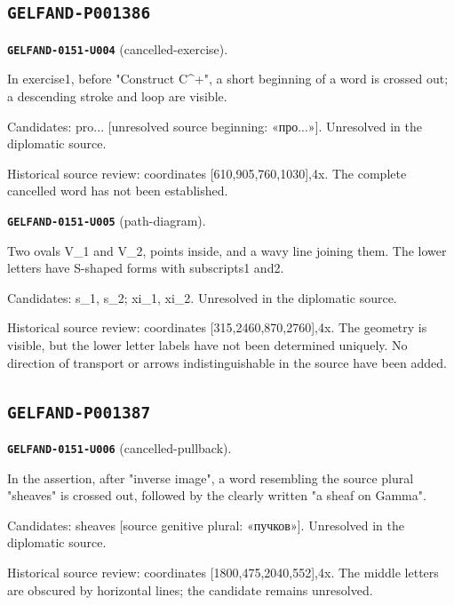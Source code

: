 \subsection*{\texttt{GELFAND-P001386}}
\par\noindent\leavevmode{}\label{GELFAND-0151-U004}\textbf{\texttt{GELFAND-0151-U004}} (cancelled-exercise).\nopagebreak[4]\par
In exercise1, before "Construct C\textasciicircum{}+", a short beginning of a word is crossed out; a descending stroke and loop are visible.\par
Candidates: pro... [unresolved source beginning: «про...»]. Unresolved in the diplomatic source.\par
Historical source review: coordinates [610,905,760,1030],4x. The complete cancelled word has not been established.\par
\medskip
\par\noindent\leavevmode{}\label{GELFAND-0151-U005}\textbf{\texttt{GELFAND-0151-U005}} (path-diagram).\nopagebreak[4]\par
Two ovals V\_1 and V\_2, points inside, and a wavy line joining them. The lower letters have S-shaped forms with subscripts1 and2.\par
Candidates: s\_1, s\_2; xi\_1, xi\_2. Unresolved in the diplomatic source.\par
Historical source review: coordinates [315,2460,870,2760],4x. The geometry is visible, but the lower letter labels have not been determined uniquely. No direction of transport or arrows indistinguishable in the source have been added.\par
\medskip
\subsection*{\texttt{GELFAND-P001387}}
\par\noindent\leavevmode{}\label{GELFAND-0151-U006}\textbf{\texttt{GELFAND-0151-U006}} (cancelled-pullback).\nopagebreak[4]\par
In the assertion, after "inverse image", a word resembling the source plural "sheaves" is crossed out, followed by the clearly written "a sheaf on Gamma".\par
Candidates: sheaves [source genitive plural: «пучков»]. Unresolved in the diplomatic source.\par
Historical source review: coordinates [1800,475,2040,552],4x. The middle letters are obscured by horizontal lines; the candidate remains unresolved.\par
\medskip
